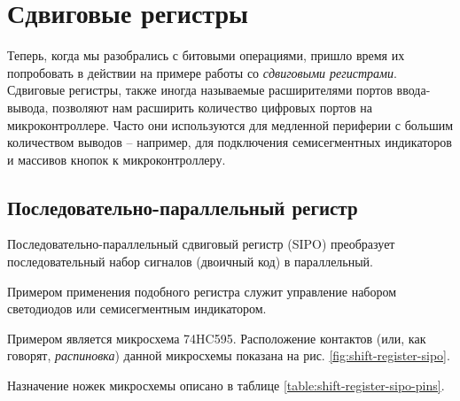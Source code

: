 \documentclass[../sparc.tex]{subfiles}
\begin{document}
\newpage
\section{Сдвиговые регистры}
\label{section:shift-registers}


Теперь, когда мы разобрались с битовыми операциями, пришло время их попробовать
в действии на примере работы со \emph{сдвиговыми регистрами}.  Сдвиговые
регистры, также иногда называемые расширителями портов ввода-вывода, позволяют
нам расширить количество цифровых портов на микроконтроллере.  Часто они
используются для медленной периферии с большим количеством выводов -- например,
для подключения семисегментных индикаторов и массивов кнопок к микроконтроллеру.

\subsection{Последовательно-параллельный регистр}

Последовательно-параллельный сдвиговый регистр (\gls{SIPO}) преобразует
последовательный набор сигналов (двоичный код) в параллельный.

Примером применения подобного регистра служит управление набором светодиодов или
семисегментным индикатором.

Примером является микросхема 74HC595.  Расположение контактов (или, как говорят,
\emph{распиновка}) данной микросхемы показана на
рис. \ref{fig:shift-register-sipo}.


Назначение ножек микросхемы описано в таблице
\ref{table:shift-register-sipo-pins}.
\end{document}
